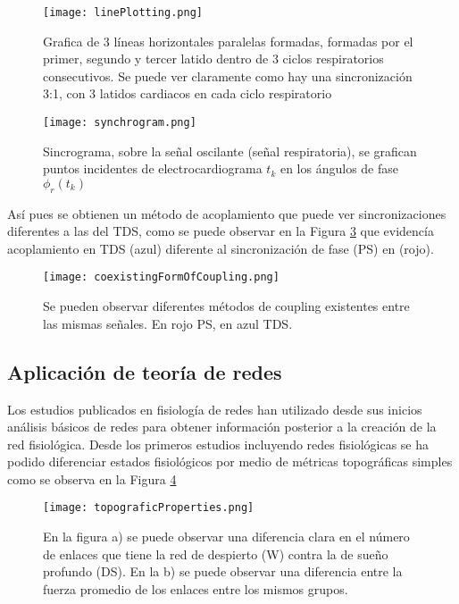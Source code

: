 \documentclass[twoside,twocolumn]{article}
\begin{document}
\begin{figure}[H]
  \texttt{[image: linePlotting.png]}
  \caption{Grafica de 3 líneas horizontales paralelas formadas, formadas por el primer, segundo y tercer latido dentro de 3 ciclos respiratorios consecutivos. Se puede ver claramente como hay una sincronización 3:1, con 3 latidos cardiacos en cada ciclo respiratorio}
  \label{fig:linePlotting}
\end{figure}

\begin{figure}[H]
  \texttt{[image: synchrogram.png]}
  \caption{Sincrograma, sobre la señal oscilante (señal respiratoria), se grafican puntos incidentes de electrocardiograma $t_k$ en los ángulos de fase $\phi_r(t_k)$}
  \label{fig:synchrogram}
\end{figure}

Así pues se obtienen un método de acoplamiento que puede ver sincronizaciones diferentes a las del TDS, como se puede observar en la Figura \ref{fig:coexistingFormOfCoupling} que evidencía acoplamiento en TDS (azul) diferente al sincronización de fase (PS) en (rojo).

\begin{figure}[H]
  \texttt{[image: coexistingFormOfCoupling.png]}
  \caption{Se pueden observar diferentes métodos de coupling existentes entre las mismas señales. En rojo PS, en azul TDS.}
  \label{fig:coexistingFormOfCoupling}
\end{figure}

\subsection{Aplicación de teoría de redes}
Los estudios publicados en fisiología de redes han utilizado desde sus inicios análisis básicos de redes para obtener información posterior a la creación de la red fisiológica.
Desde los primeros estudios incluyendo redes fisiológicas se ha podido diferenciar estados fisiológicos por medio de métricas topográficas simples como se observa en la Figura \ref{fig:topograficProperties}

\begin{figure}[H]
  \texttt{[image: topograficProperties.png]}
  \caption{En la figura a) se puede observar una diferencia clara en el número de enlaces que tiene la red de despierto (W) contra la de sueño profundo (DS). En la b) se puede observar una diferencia entre la fuerza promedio de los enlaces entre los mismos grupos.}
  \label{fig:topograficProperties}
\end{figure}
\end{document}
